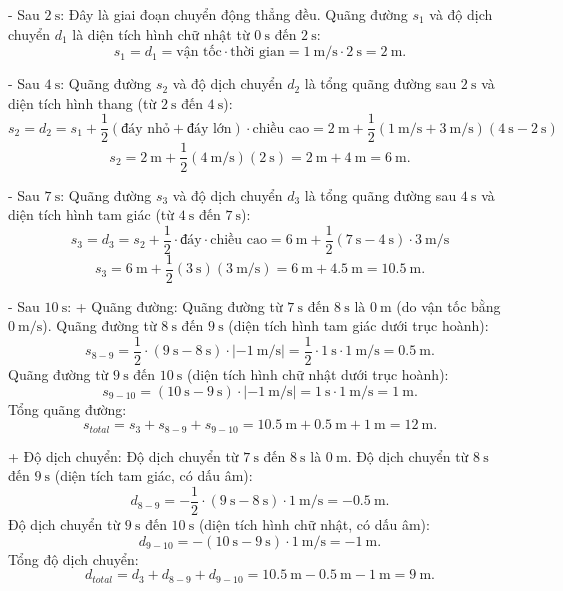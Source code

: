 \begin{ex}
{\begin{enumerate}[label=\alph*)]
			- Sau $\SI{2}{\second}$:
			Đây là giai đoạn chuyển động thẳng đều. Quãng đường $s_1$ và độ dịch chuyển $d_1$ là diện tích hình chữ nhật từ $\SI{0}{\second}$ đến $\SI{2}{\second}$:
			$$s_1 = d_1 = \text{vận tốc} \cdot \text{thời gian} = \SI{1}{\meter/\second} \cdot \SI{2}{\second} = \SI{2}{\meter}.$$
			
			- Sau $\SI{4}{\second}$:
			Quãng đường $s_2$ và độ dịch chuyển $d_2$ là tổng quãng đường sau $\SI{2}{\second}$ và diện tích hình thang (từ $\SI{2}{\second}$ đến $\SI{4}{\second}$):
			$$s_2 = d_2 = s_1 + \dfrac{1}{2} (\text{đáy nhỏ}+\text{đáy lớn})\cdot\text{chiều cao} = \SI{2}{\meter} + \dfrac{1}{2} (\SI{1}{\meter/\second}+\SI{3}{\meter/\second})(\SI{4}{\second}-\SI{2}{\second})$$
			$$s_2 = \SI{2}{\meter} + \dfrac{1}{2} (\SI{4}{\meter/\second})(\SI{2}{\second}) = \SI{2}{\meter} + \SI{4}{\meter} = \SI{6}{\meter}.$$
			
			- Sau $\SI{7}{\second}$:
			Quãng đường $s_3$ và độ dịch chuyển $d_3$ là tổng quãng đường sau $\SI{4}{\second}$ và diện tích hình tam giác (từ $\SI{4}{\second}$ đến $\SI{7}{\second}$):
			$$s_3 = d_3 = s_2 + \dfrac{1}{2} \cdot \text{đáy} \cdot \text{chiều cao} = \SI{6}{\meter} + \dfrac{1}{2} (\SI{7}{\second}-\SI{4}{\second}) \cdot \SI{3}{\meter/\second}$$
			$$s_3 = \SI{6}{\meter} + \dfrac{1}{2} (\SI{3}{\second})(\SI{3}{\meter/\second}) = \SI{6}{\meter} + \SI{4.5}{\meter} = \SI{10.5}{\meter}.$$
			
			- Sau $\SI{10}{\second}$:
			+ Quãng đường:
			Quãng đường từ $\SI{7}{\second}$ đến $\SI{8}{\second}$ là $\SI{0}{\meter}$ (do vận tốc bằng $\SI{0}{\meter/\second}$).
			Quãng đường từ $\SI{8}{\second}$ đến $\SI{9}{\second}$ (diện tích hình tam giác dưới trục hoành):
			$$s_{8-9} = \dfrac{1}{2} \cdot (\SI{9}{\second}-\SI{8}{\second}) \cdot |\SI{-1}{\meter/\second}| = \dfrac{1}{2} \cdot \SI{1}{\second} \cdot \SI{1}{\meter/\second} = \SI{0.5}{\meter}.$$
			Quãng đường từ $\SI{9}{\second}$ đến $\SI{10}{\second}$ (diện tích hình chữ nhật dưới trục hoành):
			$$s_{9-10} = (\SI{10}{\second}-\SI{9}{\second}) \cdot |\SI{-1}{\meter/\second}| = \SI{1}{\second} \cdot \SI{1}{\meter/\second} = \SI{1}{\meter}.$$
			Tổng quãng đường:
			$$s_{total} = s_3 + s_{8-9} + s_{9-10} = \SI{10.5}{\meter} + \SI{0.5}{\meter} + \SI{1}{\meter} = \SI{12}{\meter}.$$
			
			+ Độ dịch chuyển:
			Độ dịch chuyển từ $\SI{7}{\second}$ đến $\SI{8}{\second}$ là $\SI{0}{\meter}$.
			Độ dịch chuyển từ $\SI{8}{\second}$ đến $\SI{9}{\second}$ (diện tích tam giác, có dấu âm):
			$$d_{8-9} = -\dfrac{1}{2} \cdot (\SI{9}{\second}-\SI{8}{\second}) \cdot \SI{1}{\meter/\second} = -\SI{0.5}{\meter}.$$
			Độ dịch chuyển từ $\SI{9}{\second}$ đến $\SI{10}{\second}$ (diện tích hình chữ nhật, có dấu âm):
			$$d_{9-10} = -(\SI{10}{\second}-\SI{9}{\second}) \cdot \SI{1}{\meter/\second} = -\SI{1}{\meter}.$$
			Tổng độ dịch chuyển:
			$$d_{total} = d_3 + d_{8-9} + d_{9-10} = \SI{10.5}{\meter} - \SI{0.5}{\meter} - \SI{1}{\meter} = \SI{9}{\meter}.$$
		\end{enumerate}
	}
\end{ex}

